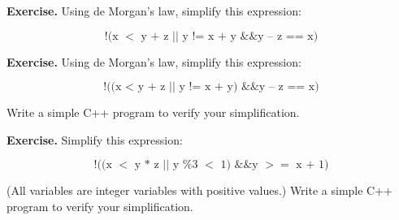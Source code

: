 \textbf{Exercise.} Using de Morgan's law, simplify this expression:

\[\text{!(x $<$ y + z $||$ y != x + y \&\& y – z == x)}\]

\textbf{Exercise.} Using de Morgan's law, simplify this expression:

\[\text{!((x < y + z $||$ y != x + y) \&\& y – z == x)}\]

Write a simple C++ program to verify your simplification.

\textbf{Exercise.} Simplify this expression:

\[\text{!((x $<$ y * z $||$ y \% 3 $<$ 1) \&\& y $>=$ x + 1)}\]

(All variables are integer variables with positive values.) Write a simple
C++ program to verify your simplification.

